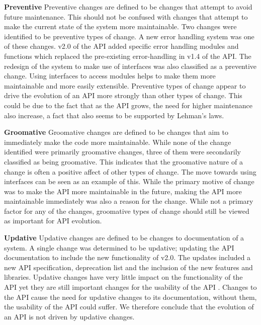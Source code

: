 \documentclass{sig-alternate}
\begin{document}
\smallskip \noindent
\textbf{Preventive  }
Preventive changes are defined to be changes that attempt to avoid future maintenance. This should not be confused with changes that attempt to make the current state of the system more maintainable.
Two changes were identified to be preventive types of change. A new error handling system was one of these changes. v2.0 of the API added specific error handling modules and functions which replaced the pre-existing error-handling in v1.4 of the API. The redesign of the system to make use of interfaces was also classified as a preventive change. Using interfaces to access modules helps to make them more maintainable and more easily extensible.
Preventive types of change appear to drive the evolution of an API more strongly than other types of change. This could be due to the fact that as the API grows, the need for higher maintenance also increase, a fact that also seems to be supported by Lehman's laws.

\smallskip \noindent
\textbf{Groomative  }
Groomative changes are defined to be changes that aim to immediately make the code more maintainable.
While none of the change identified were primarily groomative changes, three of them were secondarily classified as being groomative. This indicates that the groomative nature of a change is often a positive affect of other types of change. The move towards using interfaces can be seen as an example of this. While the primary motive of change was to make the API more maintainable in the future, making the API more maintainable immediately was also a reason for the change.
While not a primary factor for any of the changes, groomative types of change should still be viewed as important for API evolution.

\smallskip \noindent
\textbf{Updative  }
Updative changes are defined to be changes to documentation of a system.
A single change was determined to be updative; updating the API documentation to include the new functionality of v2.0. The updates included a new API specification, deprecation list and the inclusion of the new features and libraries.
Updative changes have very little impact on the functionality of the API yet they are still important changes for the usability of the API \cite{shi2011empirical}. Changes to the API cause the need for updative changes to its documentation, without them, the usability of the API could suffer. We therefore conclude that the evolution of an API is not driven by updative changes.
\end{document}
